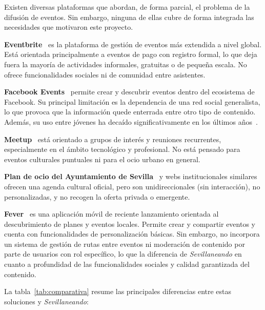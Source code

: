 Existen diversas plataformas que abordan, de forma parcial, el problema de la difusión de eventos. Sin embargo, ninguna de ellas cubre de forma integrada las necesidades que motivaron este proyecto.

\textbf{Eventbrite}~\cite{eventbrite} es la plataforma de gestión de eventos más extendida a nivel global. Está orientada principalmente a eventos de pago con registro formal, lo que deja fuera la mayoría de actividades informales, gratuitas o de pequeña escala. No ofrece funcionalidades sociales ni de comunidad entre asistentes.

\textbf{Facebook Events}~\cite{facebook} permite crear y descubrir eventos dentro del ecosistema de Facebook. Su principal limitación es la dependencia de una red social generalista, lo que provoca que la información quede enterrada entre otro tipo de contenido. Además, su uso entre jóvenes ha decaído significativamente en los últimos años~\cite{pewresearch2023}.

\textbf{Meetup}~\cite{meetup} está orientado a grupos de interés y reuniones recurrentes, especialmente en el ámbito tecnológico y profesional. No está pensado para eventos culturales puntuales ni para el ocio urbano en general.

\textbf{Plan de ocio del Ayuntamiento de Sevilla}~\cite{ayuntamientosevilla} y webs institucionales similares ofrecen una agenda cultural oficial, pero son unidireccionales (sin interacción), no personalizadas, y no recogen la oferta privada o emergente.

\textbf{Fever}~\cite{fever} es una aplicación móvil de reciente lanzamiento orientada al descubrimiento de planes y eventos locales. Permite crear y compartir eventos y cuenta con funcionalidades de personalización básicas. Sin embargo, no incorpora un sistema de gestión de rutas entre eventos ni moderación de contenido por parte de usuarios con rol específico, lo que la diferencia de \textit{Sevillaneando} en cuanto a profundidad de las funcionalidades sociales y calidad garantizada del contenido.

La tabla~\ref{tab:comparativa} resume las principales diferencias entre estas soluciones y \textit{Sevillaneando}:


